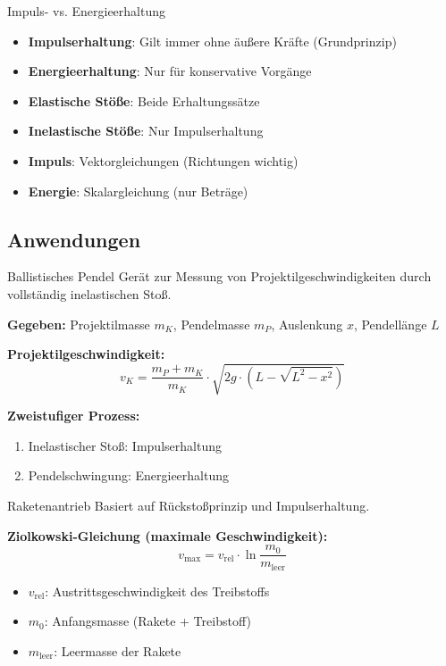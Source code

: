 \begin{concept}{Impuls- vs. Energieerhaltung}
    \begin{itemize}
        \item \textbf{Impulserhaltung}: Gilt immer ohne äußere Kräfte (Grundprinzip)
        \item \textbf{Energieerhaltung}: Nur für konservative Vorgänge
        \item \textbf{Elastische Stöße}: Beide Erhaltungssätze
        \item \textbf{Inelastische Stöße}: Nur Impulserhaltung
        \item \textbf{Impuls}: Vektorgleichungen (Richtungen wichtig)
        \item \textbf{Energie}: Skalargleichung (nur Beträge)
    \end{itemize}
\end{concept}

\subsection{Anwendungen}

\begin{example2}{Ballistisches Pendel}
    Gerät zur Messung von Projektilgeschwindigkeiten durch vollständig inelastischen Stoß.
    
    \textbf{Gegeben:} Projektilmasse $m_K$, Pendelmasse $m_P$, Auslenkung $x$, Pendellänge $L$
    
    \textbf{Projektilgeschwindigkeit:}
    \begin{equation}
        v_K = \frac{m_P + m_K}{m_K} \cdot \sqrt{2g \cdot (L - \sqrt{L^2 - x^2})}
    \end{equation}
    
    \textbf{Zweistufiger Prozess:}
    \begin{enumerate}
        \item Inelastischer Stoß: Impulserhaltung
        \item Pendelschwingung: Energieerhaltung
    \end{enumerate}
\end{example2}

\begin{example2}{Raketenantrieb}
    Basiert auf Rückstoßprinzip und Impulserhaltung.
    
    \textbf{Ziolkowski-Gleichung (maximale Geschwindigkeit):}
    \begin{equation}
        v_{\text{max}} = v_{\text{rel}} \cdot \ln\frac{m_0}{m_{\text{leer}}}
    \end{equation}
    
    \begin{itemize}
        \item $v_{\text{rel}}$: Austrittsgeschwindigkeit des Treibstoffs
        \item $m_0$: Anfangsmasse (Rakete + Treibstoff)
        \item $m_{\text{leer}}$: Leermasse der Rakete
    \end{itemize}
\end{example2}

